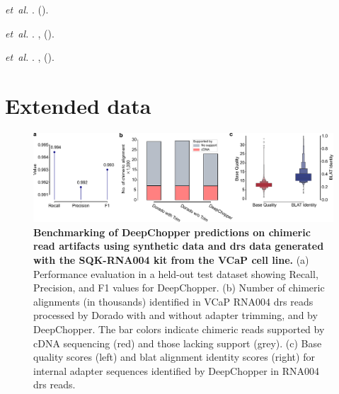 \documentclass[pdflatex,sn-nature, lineno]{sn-jnl}%
\begin{document}
\begin{thebibliography}{10}
	 \emph{et~al.}
	\newblock {}.
	\newblock \emph{}  ().

	 \emph{et~al.}
	\newblock {}.
	\newblock \emph{} \textbf{},  ().

	 \emph{et~al.}
	\newblock {}.
	\newblock \emph{} \textbf{},  ().

\end{thebibliography}

\newpage

\section{Extended data}

\renewcommand{\figurename}{Extended Data Fig.}


\begin{figure}[!ht]
	\includegraphics[height=0.29\columnwidth]{finals/sf1}
	\caption{ {\bf Benchmarking of DeepChopper predictions on chimeric read artifacts using synthetic data and \gls{drs} data generated with the SQK-RNA004 kit from the VCaP cell line.} (a) Performance evaluation in a held-out test dataset showing Recall, Precision, and F1 values for DeepChopper. (b) Number of chimeric alignments (in thousands) identified in VCaP RNA004 \gls{drs} reads processed by Dorado with and without adapter trimming, and by DeepChopper. The bar colors indicate chimeric reads supported by cDNA sequencing (red) and those lacking support (grey). (c) Base quality scores (left) and \gls{blat} alignment identity scores (right) for internal adapter sequences identified by DeepChopper in RNA004 \gls{drs} reads.}\label{fig:sf1}
\end{figure}
\end{document}
